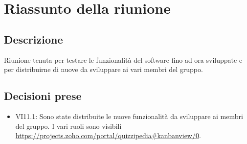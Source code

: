 \section{Riassunto della riunione}
\subsection{Descrizione}

Riunione tenuta per testare le funzionalità del software fino ad ora sviluppate e per distribuirne di nuove da sviluppare ai vari membri del gruppo.

\subsection{Decisioni prese}
\begin{itemize}
\item VI11.1: Sono state distribuite le nuove funzionalità da sviluppare ai membri del gruppo. I vari ruoli sono visibili  \url{https://projects.zoho.com/portal/quizzipedia#kanbanview/0}.
\end{itemize}

